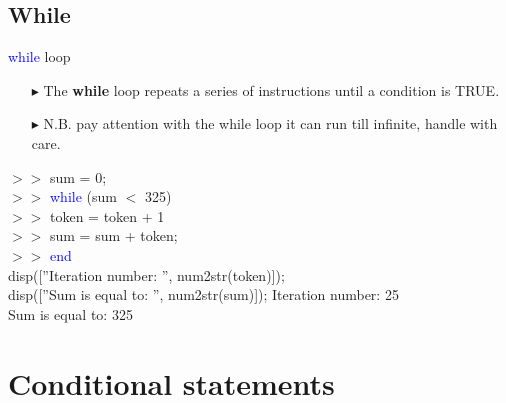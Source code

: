 \documentclass[xcolor={dvipsnames,rgb}, aspectratio=169]{beamer}
\begin{document}
\subsection{While}
\begin{frame}{\textcolor{blue}{while} loop}
\vspace{-10pt}
\begin{itemize}
    \item[$\blacktriangleright$] The \textbf{while} loop repeats a series of instructions
       \alert{until a condition is TRUE}.
    \item[$\blacktriangleright$] N.B. pay attention with the while loop it can run till
       infinite, \alert{handle with care}.
\end{itemize}
\begin{tcolorbox}[colback=white,colframe=bluepoli]
   $>>$ sum = 0; \\
   $>>$ \textcolor{blue}{while} (sum $<$ 325)\\
   $>>$ \hspace{1em}token = token + 1\\
   $>>$ \hspace{1em}sum = sum + token; \\
   $>>$ \textcolor{blue}{end}\\
   disp([''Iteration number: '', num2str(token)]); \\
   disp([''Sum is equal to:  '', num2str(sum)]); 
   \tcblower
   Iteration number: 25 \\
   Sum is equal to: 325
\end{tcolorbox}
\end{frame}

\section{Conditional statements}
\end{document}
